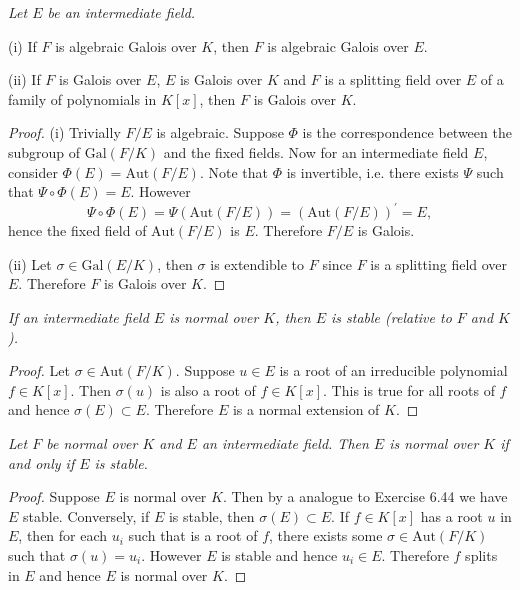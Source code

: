 \begin{problem}\em
Let $E$ be an intermediate field.\par
(i) If $F$ is algebraic Galois over $K$, then $F$ is algebraic Galois over $E$.\par
(ii) If $F$ is Galois over $E$, $E$ is Galois over $K$ and $F$ is a splitting field over $E$ of a family of polynomials in $K[x]$, then $F$ is Galois over $K$.\par
\end{problem}
\begin{proof}
(i) Trivially $F/E$ is algebraic. Suppose $\Phi$ is the correspondence between the subgroup of $\mathrm{Gal}(F/K)$ and the fixed fields. Now for an intermediate field $E$, consider $\Phi(E)=\mathrm{Aut}(F/E)$. Note that $\Phi$ is invertible, i.e. there exists $\Psi$ such that $\Psi\circ\Phi(E)=E$. However 
$$
\Psi \circ \Phi \left( E \right) =\Psi \left( \mathrm{Aut}\left( F/E \right) \right) =\left( \mathrm{Aut}\left( F/E \right) \right) ^{\prime}=E,
$$
hence the fixed field of $\mathrm{Aut}(F/E)$ is $E$. Therefore $F/E$ is Galois.\par
(ii) Let $\sigma\in\mathrm{Gal}(E/K)$, then $\sigma$ is extendible to $F$ since $F$ is a splitting field over $E$. Therefore $F$ is Galois over $K$.
\end{proof}
\begin{problem}\em
If an intermediate field $E$ is normal over $K$, then $E$ is stable (relative to $F$ and $K$).
\end{problem}
\begin{proof}
Let $\sigma\in\mathrm{Aut}(F/K)$. Suppose $u\in E$ is a root of an irreducible polynomial $f\in K[x]$. Then $\sigma(u)$ is also a root of $f\in K[x]$. This is true for all roots of $f$ and hence $\sigma(E)\subset E$. Therefore $E$ is a normal extension of $K$.
\end{proof}
\begin{problem}\em
Let $F$ be normal over $K$ and $E$ an intermediate field. Then $E$ is normal over $K$ if and only if $E$ is stable.
\end{problem}
\begin{proof}
Suppose $E$ is normal over $K$. Then by a analogue to Exercise 6.44 we have $E$ stable. Conversely, if $E$ is stable, then $\sigma(E)\subset E$. If $f\in K[x]$ has a root $u$ in $E$, then for each $u_i$ such that is a root of $f$, there exists some $\sigma\in\mathrm{Aut}(F/K)$ such that $\sigma(u)=u_i$. However $E$ is stable and hence $u_i\in E$. Therefore $f$ splits in $E$ and hence $E$ is normal over $K$.
\end{proof}
